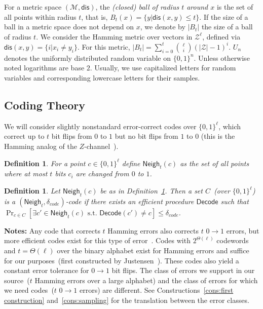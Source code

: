 \documentclass[11pt]{article}
\newcommand{\defref}[1]{\mbox{Definition~\ref{#1}}}
\newcommand{\class}[1]{{\ensuremath{\mathsf{#1}}}}
\newcommand{\zo}{\ensuremath{\{0, 1\}}}
\newcommand{\neigh}{\ensuremath{\class{Neigh}}\xspace}
\newcommand{\dis}{\ensuremath{\mathsf{dis}}}
\newcommand{\decode}{\ensuremath{\mathsf{Decode}}}
\newtheorem{definition}[theorem]{Definition}
\begin{document}
For a metric space $(\mathcal{M}, \dis)$, the \emph{(closed) ball of radius $t$ around $x$} is the set of all points within radius $t$, that is, $B_t(x) = \{y| \dis(x, y)\leq t\}$.  If the size of a ball in a metric space does not depend on $x$, we denote by $|B_t|$ the size of a ball of radius $t$.  We consider the Hamming metric over vectors in $\mathcal{Z}^\ell$, defined via $\dis(x,y) = \{i | x_i \neq y_i\}$.  For this metric, $|B_t| = \sum_{i=0}^t {\ell \choose i} (|\mathcal{Z}|-1)^i $.  $U_n$ denotes the uniformly  distributed random variable on $\{0,1\}^n$.  Unless otherwise noted logarithms are base $2$.
Usually, we use capitalized letters for random variables and corresponding lowercase letters for their samples.

\subsection{Coding Theory}
\label{sec:coding theory}
We will consider slightly nonstandard error-correct codes over $\{0,1\}^\ell$, which correct up to $t$ bit flips from $0$ to $1$ but no bit flips from $1$ to $0$ (this is the Hamming analog of the $Z$-channel~\cite{tallini2002capacity}).
\begin{definition}
\label{def:hamming z channel}
For a point $c\in \zo^\ell$ define $\neigh_t(c) $ as the set of all points where at most $t$ bits $c_i$ are changed from $0$ to $1$.
\end{definition}

\begin{definition}
Let $\neigh_t(c)$ be as in \defref{def:hamming z channel}.  Then a set $C$~(over $\zo^\ell$) is a $(\neigh_t, \delta_{code})$-code if there exists an efficient procedure $\decode$ such that $\Pr_{c\in C}[\exists c'\in \neigh_t(c) \text{ s.t. } \decode(c') \neq c] \leq \delta_{code}$.
\end{definition}

\textbf{Notes:}
Any code that corrects $t$ Hamming errors also corrects $t$ $0\rightarrow 1$ errors, but more efficient codes  exist for this type of error~\cite{tallini2002capacity}.
Codes with $2^{\Theta(\ell)}$ codewords and $t = \Theta(\ell)$ over the binary alphabet exist for Hamming errors and suffice for our purposes~(first constructed by Justensen~\cite{justesen1972class}).  These codes also yield a constant error tolerance for $0\rightarrow 1$ bit flips.
The class of errors we support in our source~($t$ Hamming errors over a large alphabet) and the class of errors for which we need codes~($t$ $0\rightarrow 1$ errors) are different.  See Constructions~\ref{cons:first construction} and~\ref{cons:sampling} for the translation between the error classes.
\end{document}
